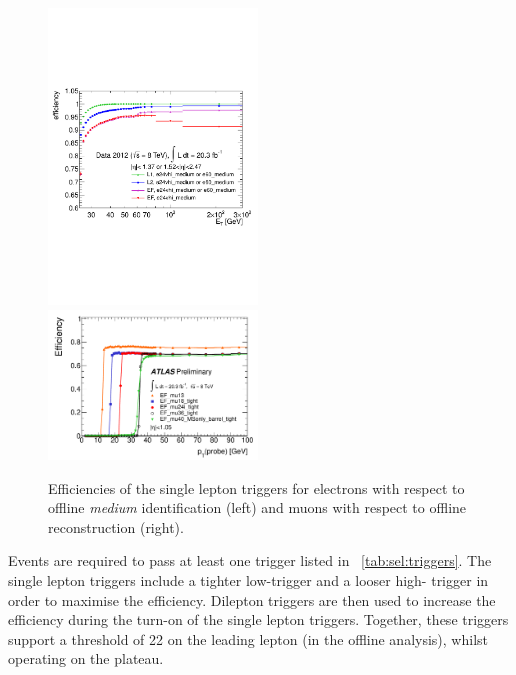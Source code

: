\begin{figure}
	\includegraphics[width=0.495\textwidth]{tex/selection/trigger_eff_el}
	\hfill
	\includegraphics[width=0.495\textwidth]{tex/selection/trigger_eff_mu}
	\caption{Efficiencies of the single lepton triggers for electrons with respect to 
	offline \textit{medium} identification (left) and muons with respect to offline 
	reconstruction (right).}
	\label{fig:sel:trig_eff}
\end{figure}

Events are required to pass at least one trigger listed in \Table~\ref{tab:sel:triggers}. 
The single lepton triggers include a tighter low-\pt trigger and a looser high-\pt 
trigger in order to maximise the efficiency. Dilepton triggers are then used to increase 
the efficiency during the turn-on of the single lepton triggers. Together, these triggers 
support a \pt threshold of \unit{22}{\GeV} on the leading lepton (in the 
offline analysis), whilst operating on the plateau.

